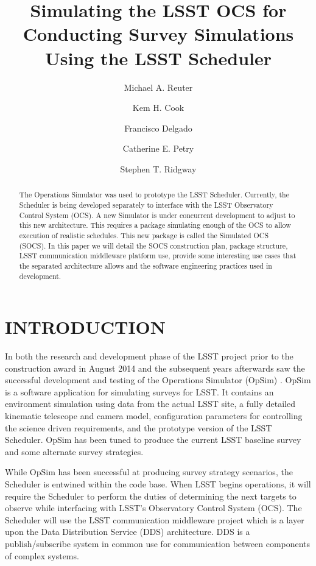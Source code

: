 \documentclass[]{spie}  %
\title{Simulating the LSST OCS for Conducting Survey Simulations Using the LSST Scheduler}
\author[a]{Michael A. Reuter}
\author[b]{Kem H. Cook}
\author[a]{Francisco Delgado}
\author[a]{Catherine E. Petry}
\author[c]{Stephen T. Ridgway}
\affil[a]{LSST, 950 N Cherry Ave, Tucson, AZ USA}
\affil[b]{Cook Astronomical Consulting, San Ramon, CA USA}
\affil[c]{National Optical Astronomy Observatory, 950 N Cherry Ave, Tucson, AZ USA}
\begin{document}
 
\maketitle

\begin{abstract}
The Operations Simulator was used to prototype the LSST Scheduler. Currently, the Scheduler is being developed separately to interface with the LSST Observatory Control System (OCS). A new Simulator is under concurrent development to adjust to this new architecture. This requires a package simulating enough of the OCS to allow execution of realistic schedules. This new package is called the Simulated OCS (SOCS). In this paper we will detail the SOCS construction plan, package structure, LSST communication middleware platform use, provide some interesting use cases that the separated architecture allows and the software engineering practices used in development.
\end{abstract}


\section{INTRODUCTION}
\label{sec:intro}  %

In both the research and development phase of the LSST project prior to the construction award in August 2014 and the subsequent years afterwards saw the successful development and testing of the Operations Simulator (OpSim) \cite{2014SPIE.9149E..0GD}\cite{2014SPIE.9150E..15D}\cite{2013AAS...22124703S}\cite{2010SPIE.7737E..0ZR}\cite{2010AAS...21540105K}\cite{2009AAS...21346004C}\cite{2007AAS...21113703P}\cite{2006SPIE.6270E..1DD}\cite{2006AAS...209.8604P}\cite{2005AAS...207.2626C}\cite{2004AAS...20510809C} . OpSim is a software application for simulating surveys for LSST. It contains an environment simulation using data from the actual LSST site, a fully detailed kinematic telescope and camera model, configuration parameters for controlling the science driven requirements, and the prototype version of the LSST Scheduler. OpSim has been tuned to produce the current LSST baseline survey and some alternate survey strategies\cite{Cook_SPIE2016}. 

While OpSim has been successful at producing survey strategy scenarios, the Scheduler is entwined within the code base. When LSST begins operations, it will require the Scheduler to perform the duties of determining the next targets to observe while interfacing with LSST's Observatory Control System (OCS)\cite{Daly_SPIE2016}. The Scheduler will use the LSST communication middleware\cite{Mills_SPIE2016} project which is a layer upon the Data Distribution Service (DDS) architecture. DDS is a publish/subscribe system in common use for communication between components of complex systems. 
\end{document}
